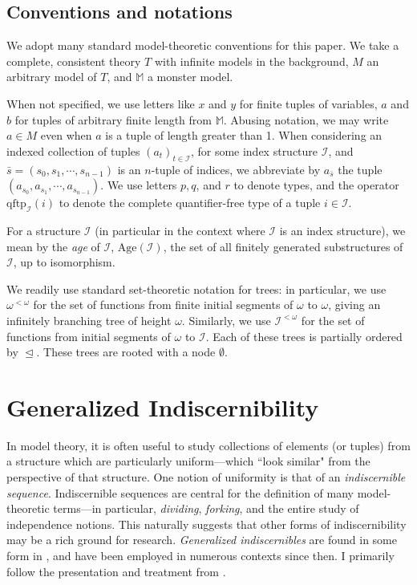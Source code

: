 \documentclass{article}
\newcommand{\bbM}{\mathbb{M}}
\newcommand{\calI}{\mathcal{I}}
\newcommand{\qftp}{\text{qftp}}
\newcommand{\Age}{\text{Age}}
\theoremstyle{definition}
\theoremstyle{definition}
\theoremstyle{definition}
\theoremstyle{definition}
\begin{document}
\subsection{Conventions and notations}
We adopt  many standard model-theoretic conventions for this paper. We take a complete, consistent theory $T$ with infinite models in the background, $M$ an arbitrary model of $T$, and $\bbM$ a monster model.

When not specified, we use letters like $x$ and $y$ for finite tuples of variables, $a$ and $b$ for tuples of arbitrary finite length from $\bbM$. Abusing notation, we may write $a\in M$ even when $a$ is a tuple of length greater than 1. When considering an indexed collection of tuples $(a_t)_{t\in \calI}$, for some index structure $\calI$, and  $\bar{s}=(s_0,s_1,\dotsm, s_{n-1})$ is an $n$-tuple of indices, we abbreviate by $a_{\bar{s}}$ the tuple $(a_{s_0},a_{s_1},\dotsm, a_{s_{n-1}})$. We use letters $p,q$, and $r$ to denote types, and the operator $\qftp_\calI(i)$ to denote the complete quantifier-free type of a tuple $i\in\calI$. 

For a structure $\calI$ (in particular in the context where $\calI$ is an index structure), we mean by the \textit{age} of $\calI$, $\Age(\calI)$, the set of all finitely generated substructures of $\calI$, up to isomorphism.

We readily use standard set-theoretic notation for trees: in particular, we use $\omega^{<\omega}$ for the set of functions from finite initial segments of $\omega$ to $\omega$, giving an infinitely branching tree of height $\omega$. Similarly, we use $\calI^{<\omega}$ for the set of functions from initial segments of $\omega$ to $\calI$. Each of these trees is partially ordered by $\trianglelefteq$. These trees are rooted with a node $\emptyset$.


\section{Generalized Indiscernibility}\label{indiscernibles section}

In model theory, it is often useful to study collections of elements (or tuples) from a structure which are particularly uniform---which ``look similar" from the perspective of that structure. One notion of uniformity is that of an \textit{indiscernible sequence}. Indiscernible sequences are central for the definition of many model-theoretic terms---in particular, \textit{dividing}, \textit{forking}, and the entire study of independence notions. This naturally suggests that other forms of indiscernibility may be a rich ground for research. \textit{Generalized indiscernibles} are found in some form in \cite{shelah_classification_1990}, and have been employed in numerous contexts since then. I primarily follow the presentation and treatment from \cite{scow_characterization_2011}. 
\end{document}
